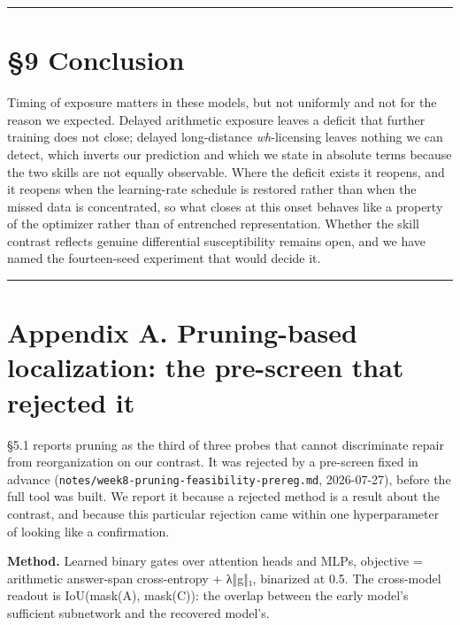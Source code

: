 \documentclass[11pt]{article}
\begin{document}
\begin{center}\rule{0.5\linewidth}{0.5pt}\end{center}

\section{§9 Conclusion}\label{conclusion}

Timing of exposure matters in these models, but not uniformly and not for the reason we
expected. Delayed arithmetic exposure leaves a deficit that further training does not close;
delayed long-distance \emph{wh}-licensing leaves nothing we can detect, which inverts our
prediction and which we state in absolute terms because the two skills are not equally
observable. Where the deficit exists it reopens, and it reopens when the learning-rate
schedule is restored rather than when the missed data is concentrated, so what closes at
this onset behaves like a property of the optimizer rather than of entrenched representation.
Whether the skill contrast reflects genuine differential susceptibility remains open, and we
have named the fourteen-seed experiment that would decide it.

\begin{center}\rule{0.5\linewidth}{0.5pt}\end{center}



\appendix
\section{Appendix A. Pruning-based localization: the pre-screen that rejected it}\label{appendix-a.-pruning-based-localization-the-pre-screen-that-rejected-it}

§5.1 reports pruning as the third of three probes that cannot discriminate repair from
reorganization on our contrast. It was rejected by a pre-screen fixed in advance
(\texttt{notes/week8-pruning-feasibility-prereg.md}, 2026-07-27), before the full tool was built.
We report it because a rejected method is a result about the contrast, and because this
particular rejection came within one hyperparameter of looking like a confirmation.

\textbf{Method.} Learned binary gates over attention heads and MLPs, objective = arithmetic
answer-span cross-entropy + λ‖g‖₁, binarized at 0.5. The cross-model readout is
IoU(mask(A), mask(C)): the overlap between the early model's sufficient subnetwork and the
recovered model's.
\end{document}
